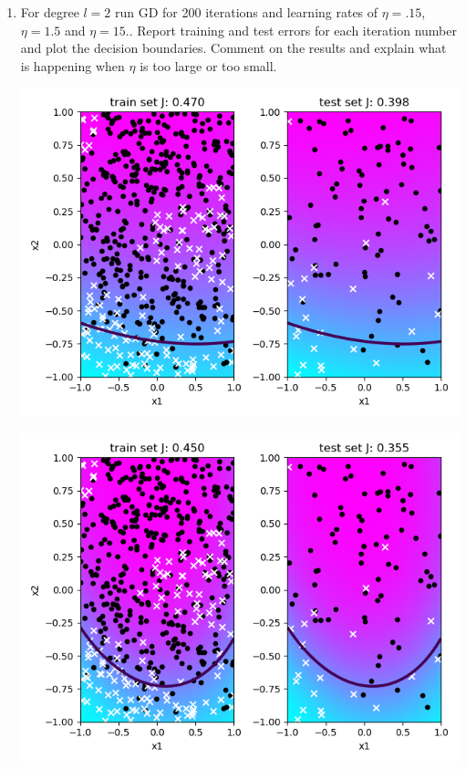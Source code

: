 \documentclass[a4paper]{article}
\begin{document}
\begin{enumerate}
\item For degree $l = 2$ run GD for 200 iterations and learning rates of $\eta = .15$, $\eta = 1.5$ and $\eta = 15.$. Report training and test errors for each iteration number and plot the decision boundaries. Comment on the results and explain what is happening when $\eta$ is too large or too small.
\begin{minipage}[b]{0.4\textwidth}
  \vspace{10pt}
                  \includegraphics[scale=0.35]{plots/gradient_descent_2_0_15_200.png}
				 \captionsetup{justification=centering}
    \label{gradient_descent_2_0.15_200}
\end{minipage}
\hfill
\begin{minipage}[b]{0.4\textwidth}
            \includegraphics[scale=0.35]{plots/gradient_descent_2_1_5_200.png}

\end{minipage}
\end{enumerate}
\end{document}
